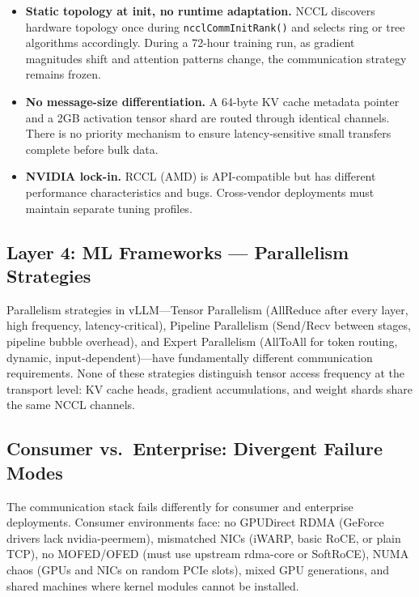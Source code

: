 \documentclass[11pt,letterpaper]{article}
\theoremstyle{definition}
\begin{document}
\begin{itemize}[leftmargin=1.5em, itemsep=3pt]
\item \textbf{Static topology at init, no runtime adaptation.} NCCL discovers hardware topology once during \texttt{ncclCommInitRank()} and selects ring or tree algorithms accordingly. During a 72-hour training run, as gradient magnitudes shift and attention patterns change, the communication strategy remains frozen.

\item \textbf{No message-size differentiation.} A 64-byte KV cache metadata pointer and a 2GB activation tensor shard are routed through identical channels. There is no priority mechanism to ensure latency-sensitive small transfers complete before bulk data.

\item \textbf{NVIDIA lock-in.} RCCL (AMD) is API-compatible but has different performance characteristics and bugs. Cross-vendor deployments must maintain separate tuning profiles.
\end{itemize}

\subsection{Layer 4: ML Frameworks --- Parallelism Strategies}

Parallelism strategies in vLLM---Tensor Parallelism (AllReduce after every layer, high frequency, latency-critical), Pipeline Parallelism (Send/Recv between stages, pipeline bubble overhead), and Expert Parallelism (AllToAll for token routing, dynamic, input-dependent)---have fundamentally different communication requirements. None of these strategies distinguish tensor access frequency at the transport level: KV cache heads, gradient accumulations, and weight shards share the same NCCL channels.

\subsection{Consumer vs.\ Enterprise: Divergent Failure Modes}

The communication stack fails differently for consumer and enterprise deployments. Consumer environments face: no GPUDirect RDMA (GeForce drivers lack nvidia-peermem), mismatched NICs (iWARP, basic RoCE, or plain TCP), no MOFED/OFED (must use upstream rdma-core or SoftRoCE), NUMA chaos (GPUs and NICs on random PCIe slots), mixed GPU generations, and shared machines where kernel modules cannot be installed.
\end{document}
